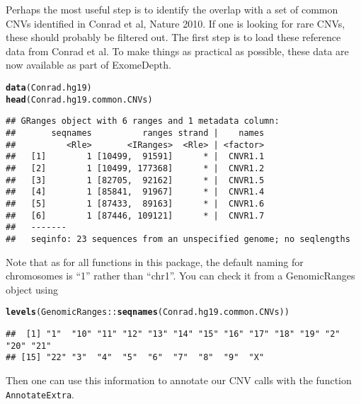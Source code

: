 \documentclass[10pt]{article}\usepackage[]{graphicx}\usepackage[]{color}
\makeatletter
\newcommand{\hlopt}[1]{\textcolor[rgb]{0,0,0}{#1}}%
\newcommand{\hlstd}[1]{\textcolor[rgb]{0.345,0.345,0.345}{#1}}%
\newcommand{\hlkwd}[1]{\textcolor[rgb]{0.737,0.353,0.396}{\textbf{#1}}}%
\newenvironment{kframe}{%
 \def\at@end@of@kframe{}%
 \ifinner\ifhmode%
  \def\at@end@of@kframe{\end{minipage}}%
  \begin{minipage}{\columnwidth}%
 \fi\fi%
 \def\FrameCommand##1{\hskip\@totalleftmargin \hskip-\fboxsep
 \colorbox{shadecolor}{##1}\hskip-\fboxsep
     \hskip-\linewidth \hskip-\@totalleftmargin \hskip\columnwidth}%
 \MakeFramed {\advance\hsize-\width
   \@totalleftmargin\z@ \linewidth\hsize
   \@setminipage}}%
 {\par\unskip\endMakeFramed%
 \at@end@of@kframe}
\newenvironment{knitrout}{}{} %
\makeatother
\begin{document}
Perhaps the most useful step is to identify the overlap with a set of common CNVs identified in Conrad et al, Nature 2010.
If one is looking for rare CNVs, these should probably be filtered out.
The first step is to load these reference data from Conrad et al. To make things as practical as possible, these data are now available as part of ExomeDepth.

\begin{knitrout}
\color{fgcolor}\begin{kframe}
\begin{alltt}
\hlkwd{data}\hlstd{(Conrad.hg19)}
\hlkwd{head}\hlstd{(Conrad.hg19.common.CNVs)}
\end{alltt}
\begin{verbatim}
## GRanges object with 6 ranges and 1 metadata column:
##       seqnames          ranges strand |    names
##          <Rle>       <IRanges>  <Rle> | <factor>
##   [1]        1 [10499,  91591]      * |  CNVR1.1
##   [2]        1 [10499, 177368]      * |  CNVR1.2
##   [3]        1 [82705,  92162]      * |  CNVR1.5
##   [4]        1 [85841,  91967]      * |  CNVR1.4
##   [5]        1 [87433,  89163]      * |  CNVR1.6
##   [6]        1 [87446, 109121]      * |  CNVR1.7
##   -------
##   seqinfo: 23 sequences from an unspecified genome; no seqlengths
\end{verbatim}
\end{kframe}
\end{knitrout}

Note that as for all functions in this package, the default naming for chromosomes is ``1'' rather than ``chr1''.
You can check it from a GenomicRanges object using
\begin{knitrout}
\color{fgcolor}\begin{kframe}
\begin{alltt}
\hlkwd{levels}\hlstd{(GenomicRanges}\hlopt{::}\hlkwd{seqnames}\hlstd{(Conrad.hg19.common.CNVs))}
\end{alltt}
\begin{verbatim}
##  [1] "1"  "10" "11" "12" "13" "14" "15" "16" "17" "18" "19" "2"  "20" "21"
## [15] "22" "3"  "4"  "5"  "6"  "7"  "8"  "9"  "X"
\end{verbatim}
\end{kframe}
\end{knitrout}

Then one can use this information to annotate our CNV calls with the function \texttt{AnnotateExtra}.
\end{document}
